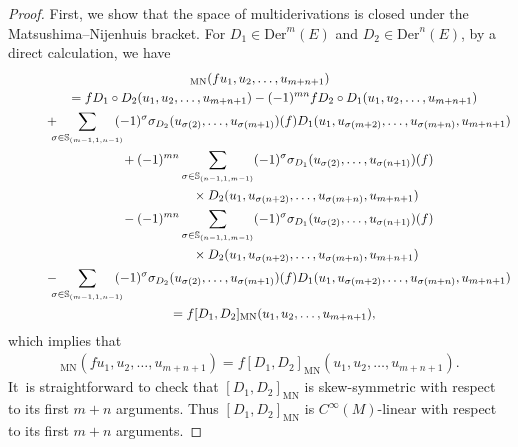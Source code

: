 \documentclass[10pt,a4paper]{amsart}
\numberwithin{equation}{section}
\newcommand{\CWM}{C^{\infty}(M)}
\newcommand{\Der}{\mathrm{Der}}
\newcommand{\MN}{\mathrm{MN}}
\begin{document}
\begin{proof}
First, we show that the space of multiderivations is closed under the Matsushima--Nijenhuis bracket. For $D_1\in \Der^m(E)$ and $D_2\in \Der^n(E)$, by a direct calculation, we have
\begin{gather*}
[D_1,D_2]_{\MN}(fu_1,u_2,\dots,u_{m+n+1})
\\ \qquad
{}=fD_1\circ D_2(u_1,u_2,\dots,u_{m+n+1})-(-1)^{mn}fD_2\circ D_1(u_1,u_2,\dots,u_{m+n+1})
\\ \qquad\hphantom{=}
{}+\!\!\!\!\sum_{\sigma\in \mathbb{S}_{(m-1,1,n-1)}}\!\!\!\!(-1)^{\sigma}\sigma_{D_2} (u_{\sigma(2)},\dots,u_{\sigma(m+1)})(f)D_1(u_1,u_{\sigma(m+2)},\dots,u_{\sigma(m+n)},u_{m+n+1})
\\ \qquad\hphantom{=}
{}+(-1)^{mn}\sum_{\sigma\in \mathbb{S}_{(n-1,1,m-1)}}(-1)^{\sigma}\sigma_{D_1} (u_{\sigma(2)},\dots,u_{\sigma(n+1)})(f)
\\ \qquad\hphantom{=+(-1)^{mn}}
{}\times D_2(u_1,u_{\sigma(n+2)},\dots,u_{\sigma(m+n)},u_{m+n+1})
\\ \qquad\hphantom{=}
{}-(-1)^{mn}\sum_{\sigma\in \mathbb{S}_{(n-1,1,m-1)}}(-1)^{\sigma}\sigma_{D_1} (u_{\sigma(2)},\dots,u_{\sigma(n+1)})(f)
\\ \qquad\hphantom{=+(-1)^{mn}}
{}\times D_2(u_1,u_{\sigma(n+2)},\dots,u_{\sigma(m+n)},u_{m+n+1})
\\ \qquad\hphantom{=}
{}-\!\!\!\!\sum_{\sigma\in \mathbb{S}_{(m-1,1,n-1)}}\!\!\!\!(-1)^{\sigma}\sigma_{D_2} (u_{\sigma(2)},\dots,u_{\sigma(m+1)})(f)D_1(u_1,u_{\sigma(m+2)},\dots,u_{\sigma(m+n)},u_{m+n+1})
\\ \qquad
{}=f[D_1,D_2]_{\MN}(u_1,u_2,\dots,u_{m+n+1}),
\end{gather*}
which implies that
\begin{gather*}
[D_1,D_2]_{\MN}(fu_1,u_2,\dots,u_{m+n+1})=f[D_1,D_2]_{\MN}(u_1,u_2,\dots,u_{m+n+1}).
\end{gather*}
It~is straightforward to check that $[D_1,D_2]_{\MN}$ is skew-symmetric with respect to its first $m+n$ arguments. Thus $[D_1,D_2]_{\MN}$ is $\CWM$-linear with respect to its first $m+n$ arguments.


\end{proof}
\end{document}
